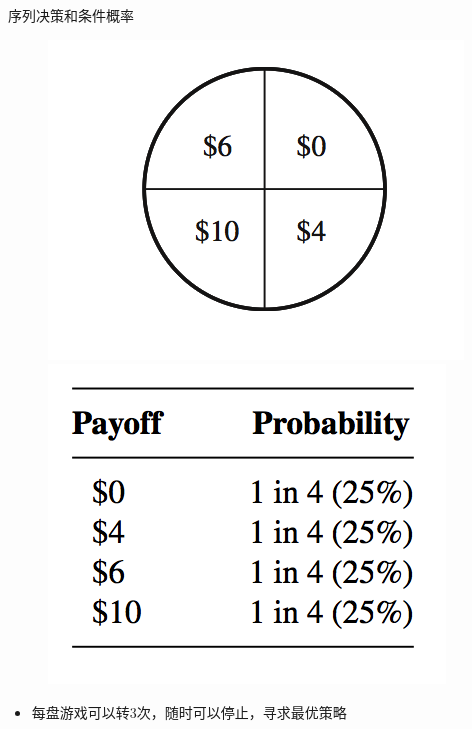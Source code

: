 \documentclass[mathserif, table]{beamer}
\begin{document}
\begin{frame}{序列决策和条件概率}
  
  \begin{figure}
    \includegraphics[height=0.4\textheight{}]{lunpan.png}
    \includegraphics[height=0.4\textheight{}]{payoff.png}
  \end{figure}

  \begin{itemize}
  \item 每盘游戏可以转3次，随时可以停止，寻求最优策略
  \end{itemize}

\end{frame}
\end{document}
